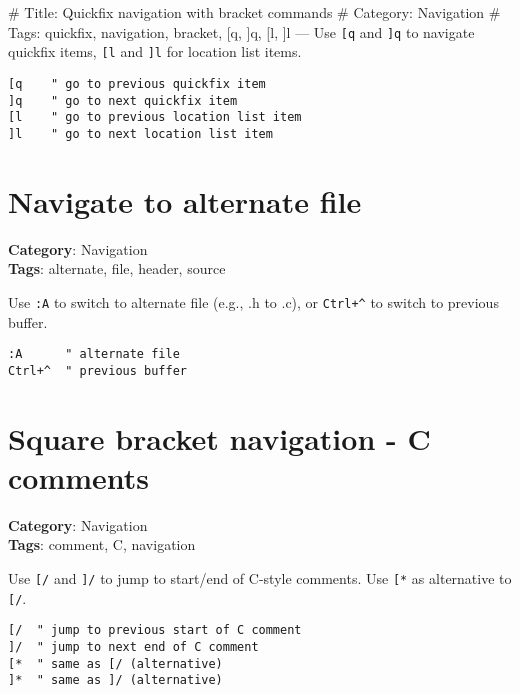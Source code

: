 {{{{{{{{{{\# Title: Quickfix navigation with bracket commands
\# Category: Navigation
\# Tags: quickfix, navigation, bracket, [q, ]q, [l, ]l
---
Use {\footnotesize \Verb§[q§} and {\footnotesize \Verb§]q§} to navigate quickfix items, {\footnotesize \Verb§[l§} and {\footnotesize \Verb§]l§} for location list items.

\begin{Exa*}{}
\begin{Verbatim}[fontsize=\footnotesize, breaklines, breakanywhere]
[q    " go to previous quickfix item
]q    " go to next quickfix item
[l    " go to previous location list item
]l    " go to next location list item
\end{Verbatim}
\end{Exa*}

\section{Navigate to alternate file}

\textbf{Category}: Navigation\\ \textbf{Tags}: alternate, file, header, source
\vspace{0.5cm}

Use {\footnotesize \Verb§:A§} to switch to alternate file (e.g., .h to .c), or {\footnotesize \Verb§Ctrl+^§} to switch to previous buffer.

\begin{Exa*}{}
\begin{Verbatim}[fontsize=\footnotesize, breaklines, breakanywhere]
:A      " alternate file
Ctrl+^  " previous buffer
\end{Verbatim}
\end{Exa*}

\section{Square bracket navigation - C comments}

\textbf{Category}: Navigation\\ \textbf{Tags}: comment, C, navigation
\vspace{0.5cm}

Use {\footnotesize \Verb§[/§} and {\footnotesize \Verb§]/§} to jump to start/end of C-style comments. Use {\footnotesize \Verb§[*§} as alternative to {\footnotesize \Verb§[/§}.

\begin{Exa*}{}
\begin{Verbatim}[fontsize=\footnotesize, breaklines, breakanywhere]
[/  " jump to previous start of C comment
]/  " jump to next end of C comment
[*  " same as [/ (alternative)
]*  " same as ]/ (alternative)
\end{Verbatim}
\end{Exa*}

}}}}}}}}}}

